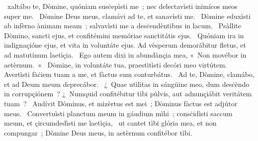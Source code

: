 { }
{%
~xaltábo te, Dòmine, quóniam susċepìsti me~; nec delectavìsti inimícos meos super me. 
~Dòmine Deus meus, clamávi ad te, et sanavìsti me. 
~Dòmine eduxìsti ab infèrno ànimam meam~; salvavìsti me a desċendèntibus in lacum. 
~Psàllite Dòmino, sancti ejus, et confitémini memóriae sanctitátis ejus. 
~Quóniam ira in indignaçióne ejus, et vita in voluntáte ejus. Ad vèsperum demorábitur fletus, et ad matutínum laetìçia. 
~Ego autem dixi in abundànçia mea, «~Non movébor in aetèrnum.~»
~Dòmine, in voluntáte tua, praestitìsti decóri meo virtútem. Avertìsti fàċiem tuam a me, et fàctus sum conturbátus. 
~Ad te, Dòmine, clamábo, et ad Deum meum deprecábor. 
~¿~Quae utìlitas in sángüine meo, dum desċèndo in corrupçiónem~? ¿~Numquid confitébitur tìbi pùlvis, aut adnunçiábit veritátem tuam~? 
~Audívit Dòminus, et mizèrtus est mei~; Dòminus fàctus est adjútor meus. 
~Convertuìsti planctum meum in gáudium mìhi~; consċidìsti saccum meum, et çircumdedìsti me laetìçia, 
~ut cantet tìbi glória mea, et non compungar~; Dòmine Deus meus, in aetèrnum confitébor tìbi. 
}
